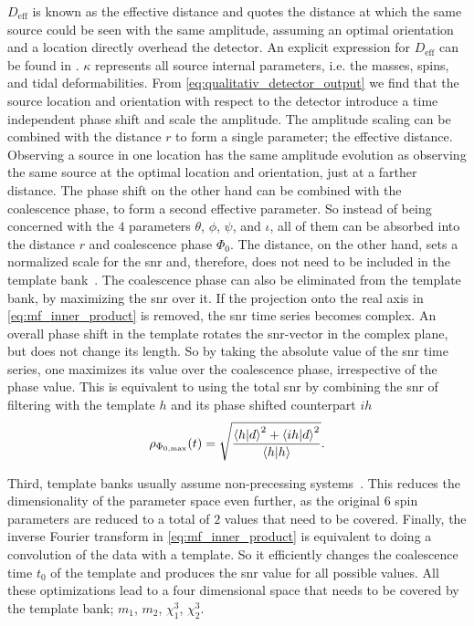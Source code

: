 $D_\text{eff}$ is known as the effective distance and quotes the distance at which the same source could be seen with the same amplitude, assuming an optimal orientation and a location directly overhead the detector. An explicit expression for $D_\text{eff}$ can be found in \cite{Allen:2005fk}. $\kappa$ represents all source internal parameters, i.e. the masses, spins, and tidal deformabilities. From \eqref{eq:qualitativ_detector_output} we find that the source location and orientation with respect to the detector introduce a time independent phase shift and scale the amplitude. The amplitude scaling can be combined with the distance $r$ to form a single parameter; the effective distance. Observing a source in one location has the same amplitude evolution as observing the same source at the optimal location and orientation, just at a farther distance. The phase shift on the other hand can be combined with the coalescence phase, to form a second effective parameter. So instead of being concerned with the $4$ parameters $\theta$, $\phi$, $\psi$, and $\iota$, all of them can be absorbed into the distance $r$ and coalescence phase $\Phi_0$. The distance, on the other hand, sets a normalized scale for the \acrshort{snr} and, therefore, does not need to be included in the template bank~\cite{Allen:2005fk}. The coalescence phase can also be eliminated from the template bank, by maximizing the \acrshort{snr} over it. If the projection onto the real axis in \eqref{eq:mf_inner_product} is removed, the \acrshort{snr} time series becomes complex. An overall phase shift in the template rotates the \acrshort{snr}-vector in the complex plane, but does not change its length. So by taking the absolute value of the \acrshort{snr} time series, one maximizes its value over the coalescence phase, irrespective of the phase value. This is equivalent to using the total \acrshort{snr} by combining the \acrshort{snr} of filtering with the template $h$ and its phase shifted counterpart $ih$~\cite{Allen:2005fk, Ohme:2012cba, Usman:2015kfa}
\begin{equation}
\rho_{\Phi_{0,\text{max}}}{\left( t \right)} = \sqrt{\frac{{\langle h\vert d\rangle}^2+{\langle ih\vert d\rangle}^2}{\langle h\vert h\rangle}}.
\end{equation}

Third, template banks usually assume non-precessing systems~\cite{LIGOScientific:2021djp, Nitz:2021zwj}. This reduces the dimensionality of the parameter space even further, as the original $6$ spin parameters are reduced to a total of $2$ values that need to be covered. Finally, the inverse Fourier transform in \eqref{eq:mf_inner_product} is equivalent to doing a convolution of the data with a template. So it efficiently changes the coalescence time $t_0$ of the template and produces the \acrshort{snr} value for all possible values. All these optimizations lead to a four dimensional space that needs to be covered by the template bank; $m_1$, $m_2$, $\chi_1^3$, $\chi_2^3$.

